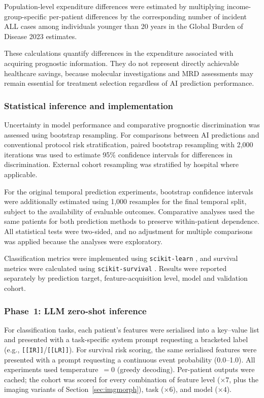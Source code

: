 \documentclass[pdflatex,sn-nature]{sn-jnl}
\begin{document}
Population-level expenditure differences were estimated by multiplying income-group-specific per-patient differences by the corresponding number of incident ALL cases among individuals younger than 20 years in the Global Burden of Disease 2023 estimates.

These calculations quantify differences in the expenditure associated with acquiring prognostic information. They do not represent directly achievable healthcare savings, because molecular investigations and MRD assessments may remain essential for treatment selection regardless of AI prediction performance.

\subsubsection{Statistical inference and implementation}
\label{sec:statistical_inference}

Uncertainty in model performance and comparative prognostic discrimination was assessed using bootstrap resampling. For comparisons between AI predictions and conventional protocol risk stratification, paired bootstrap resampling with 2,000 iterations was used to estimate 95\% confidence intervals for differences in discrimination. External cohort resampling was stratified by hospital where applicable.

For the original temporal prediction experiments, bootstrap confidence intervals were additionally estimated using 1,000 resamples for the final temporal split, subject to the availability of evaluable outcomes. Comparative analyses used the same patients for both prediction methods to preserve within-patient dependence. All statistical tests were two-sided, and no adjustment for multiple comparisons was applied because the analyses were exploratory.

Classification metrics were implemented using \texttt{scikit-learn} \cite{sklearn}, and survival metrics were calculated using \texttt{scikit-survival} \cite{sksurv}. Results were reported separately by prediction target, feature-acquisition level, model and validation cohort.
\iffalse

\subsubsection{Phase~1: LLM zero-shot inference}\label{sec:llm_inference}

For classification tasks, each patient's features were serialised into a
key--value list and presented with a task-specific system prompt
requesting a bracketed label (e.g., \texttt{[[IR]]}/\texttt{[[LR]]}).
For survival risk scoring, the same serialised features were presented
with a prompt requesting a continuous event probability (0.0--1.0).
All experiments used temperature~$=0$ (greedy decoding).
Per-patient outputs were cached; the cohort was scored for every
combination of feature level ($\times 7$, plus the imaging variants of
Section~\ref{sec:imgmorph}), task ($\times 6$), and model ($\times 4$).
\end{document}
